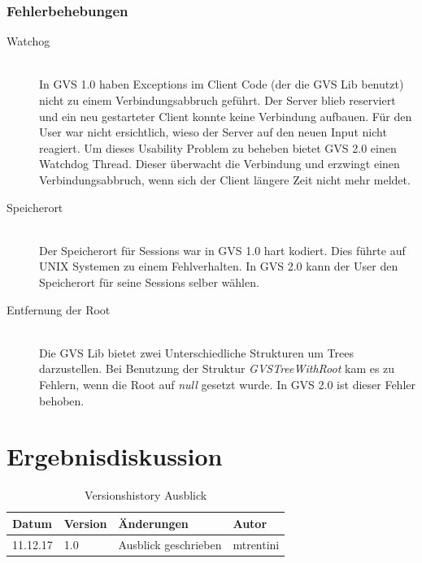 \documentclass[11pt,a4paper,english,oneside]{book}
\numberwithin{equation}{chapter}
\begin{document}
	\subsection{Fehlerbehebungen}
	\begin{description}
		\item[Watchog] \hfill \\ \label{ssec:watchdog}
		In GVS 1.0 haben Exceptions im Client Code (der die GVS Lib benutzt) nicht zu einem Verbindungsabbruch geführt. Der Server blieb reserviert und ein neu gestarteter Client konnte keine Verbindung aufbauen. Für den User war nicht ersichtlich, wieso der Server auf den neuen Input nicht reagiert. Um dieses Usability Problem zu beheben bietet GVS 2.0 einen Watchdog Thread. Dieser überwacht die Verbindung und erzwingt einen Verbindungsabbruch, wenn sich der Client längere Zeit nicht mehr meldet.
		\item[Speicherort]  \hfill \\ Der Speicherort für Sessions war in GVS 1.0 hart kodiert. Dies führte auf UNIX Systemen zu einem Fehlverhalten. In GVS 2.0 kann der User den Speicherort für seine Sessions selber wählen.
		\item[Entfernung der Root] \hfill \\ Die GVS Lib bietet zwei Unterschiedliche Strukturen um Trees darzustellen. Bei Benutzung der Struktur \textit{GVSTreeWithRoot} kam es zu Fehlern, wenn die Root auf \textit{null} gesetzt wurde. In GVS 2.0 ist dieser Fehler behoben.
	\end{description}

	

	\chapter{Ergebnisdiskussion} \label{ch:ergebnisse}
	\begin{table}[h!]
		\centering
		\begin{tabularx}{\linewidth}{l l X l}
			\toprule 
			Datum & Version & Änderungen & Autor \\
			\midrule
			11.12.17 & 1.0 & Ausblick geschrieben & mtrentini \\
			\bottomrule 
		\end{tabularx} 
		\caption{Versionshistory Ausblick} 
	\end{table}	
	
\end{document}
